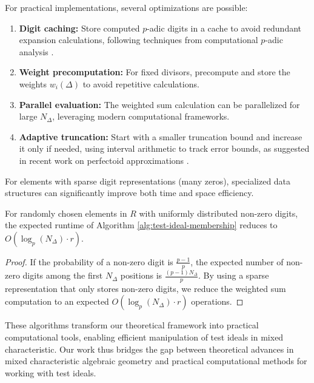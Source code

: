 For practical implementations, several optimizations are possible:

\begin{enumerate}
    \item \textbf{Digit caching:} Store computed $p$-adic digits in a cache to avoid redundant expansion calculations, following techniques from computational $p$-adic analysis \cite{AMBT19}.
    
    \item \textbf{Weight precomputation:} For fixed divisors, precompute and store the weights $w_i(\Delta)$ to avoid repetitive calculations.
    
    \item \textbf{Parallel evaluation:} The weighted sum calculation can be parallelized for large $N_\Delta$, leveraging modern computational frameworks.
    
    \item \textbf{Adaptive truncation:} Start with a smaller truncation bound and increase it only if needed, using interval arithmetic to track error bounds, as suggested in recent work on perfectoid approximations \cite{BS22}.
\end{enumerate}

For elements with sparse digit representations (many zeros), specialized data structures can significantly improve both time and space efficiency.

\begin{theorem}
For randomly chosen elements in $R$ with uniformly distributed non-zero digits, the expected runtime of Algorithm \ref{alg:test-ideal-membership} reduces to $O(\log_p(N_\Delta) \cdot r)$.
\end{theorem}

\begin{proof}
If the probability of a non-zero digit is $\frac{p-1}{p}$, the expected number of non-zero digits among the first $N_\Delta$ positions is $\frac{(p-1)N_\Delta}{p}$. By using a sparse representation that only stores non-zero digits, we reduce the weighted sum computation to an expected $O(\log_p(N_\Delta) \cdot r)$ operations.
\end{proof}

These algorithms transform our theoretical framework into practical computational tools, enabling efficient manipulation of test ideals in mixed characteristic. Our work thus bridges the gap between theoretical advances in mixed characteristic algebraic geometry and practical computational methods for working with test ideals.

